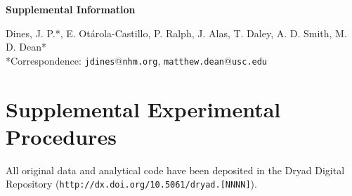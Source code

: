 \documentclass[12pt]{article}
\newcommand{\url}[1]{\texttt{#1}}
\newcommand{\email}[1]{\texttt{#1}}
\begin{document}
\appendix
\renewcommand{\thefigure}{S\arabic{figure}}
\setcounter{figure}{0}
\renewcommand{\thetable}{S\arabic{table}}
\setcounter{table}{0}



\noindent
\begin{center}
  \textbf{Supplemental Information} 

Dines, J. P.*, E. Ot\'arola-Castillo, P. Ralph, J. Alas, T. Daley, A. D. Smith, M. D. Dean*\\
*Correspondence: \email{jdines$@$nhm.org}, \email{matthew.dean$@$usc.edu}
\end{center}


\pagebreak

\nocite{uhen2010,perrin2013,schulte1918,pabst1998,meek1918,mate2005,brownell1986,fitzpatrick2012,ramm2005,firman2008,kenagy1986,moller1989,harcourt1981,stockley1997,gage1994,hosken2001,suppmat,danilewicz2004,mcgowen2009,revell2009,heyning1994,rohlf1990,slice2007,adams2012,bookstein1997,bookstein1996,mitteroecker2009,gunz2005,mcardle2001,vanbree1973,andersen1992,perrin1975,eberhard1985,arnqvist1998,hosken2004,ramm2007}

\section{Supplemental Experimental Procedures}
All original data and analytical code have been deposited in the Dryad Digital Repository (\url{http://dx.doi.org/10.5061/dryad.[NNNN]}). 
\end{document}
